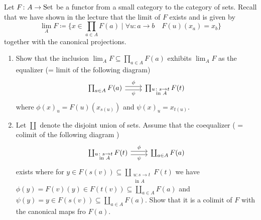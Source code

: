 \begin{Exercise}
    Let $ F \colon A \to \operatorname{Set} $ be a functor from a small category to the category of sets.
    Recall that we have shown in the lecture that the limit of $ F $ exists and is given by 
    \[
        \lim_A F \coloneqq \bigg\{ x \in \prod_{ a \in A } F ( a ) \mid \forall u \colon a \to b \quad F ( u ) ( x_a ) = x_b \bigg\}
    \]
    together with the canonical projections.
    
    \begin{enumerate}[label=(\alph*)]
        \item 
        Show that the inclusion $ \lim_A F \subseteq \prod_{ a \in A } F ( a ) $ exhibits $ \lim_A F $ as the equalizer (= limit of the following diagram)
        \[
        \begin{tikzcd}
            \prod_{ a \in A } F ( a ) 
            \ar[r , shift left, " \phi "]
            \ar[r , shift right, " \psi "']
            &
            \prod_{ \substack{ u \colon s \to t \\ \text{ in } A} } F ( t )
        \end{tikzcd}
        \]
        where $ \phi ( x )_u = F ( u ) ( x_{ s ( u ) } ) $ and $ \psi ( x )_u = x_{ t ( u ) }$.
    
        \item 
        Let $ \coprod $ denote the disjoint union of sets. 
        Assume that the coequalizer ( = colimit of the following diagram ) 
        \[
        \begin{tikzcd}
            \coprod_{ \substack{ u \colon s \to t \\ \text{ in } A} } F ( t )
            \ar[r , shift left, " \phi "]
            \ar[r , shift right, " \psi "']
            &
            \coprod_{ a \in A } F ( a ) 
        \end{tikzcd}    
        \]
        exists where for $ y \in F ( s ( v ) ) \subseteq \coprod_{ \substack{ u \colon s \to t \\ \text{ in } A} } F ( t ) $ we have $ \phi ( y ) = F ( v ) ( y ) \in F ( t ( v ) ) \subseteq \coprod_{ a \in A } F ( a ) $ and $ \psi ( y ) = y \in F ( s ( v ) ) \subseteq \coprod_{ a \in A } F ( a ) $. Show that it is a colimit of $ F $ with the canonical maps fro $ F ( a ) $.
    \end{enumerate}
\end{Exercise}

